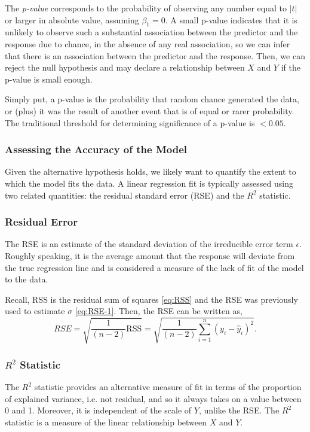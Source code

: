 \documentclass{article}
\numberwithin{equation}{section}
\begin{document}
The \textit{p-value} corresponds to the probability of observing any number equal to $|t|$ or larger in absolute value, assuming $\beta_1= 0$. A small p-value indicates that it is unlikely to observe such a substantial association between the predictor and the response due to chance, in the absence of any real association, so we can infer that there is an association between the predictor and the response. Then, we can reject the null hypothesis and may declare a relationship between $X$ and $Y$ if the p-value is small enough.

Simply put, a p-value is the probability that random chance generated the data, or (plus) it was the result of another event that is of equal or rarer probability. The traditional threshold for determining significance of a p-value is $< 0.05$.

\subsubsection{Assessing the Accuracy of the Model}
Given the alternative hypothesis holds, we likely want to quantify the extent to which the model fits the data. A linear regression fit is typically assessed using two related quantities: the residual standard error (RSE) and the $R^2$ statistic.

\subsubsection*{Residual Error}
The RSE is an estimate of the standard deviation of the irreducible error term $\epsilon$. Roughly speaking, it is the average amount that the response
will deviate from the true regression line and is considered a measure of the lack of fit of the model to the data. 

Recall, RSS is the residual sum of squares \eqref{eq:RSS} and the RSE was previously used to estimate $\sigma$ \eqref{eq:RSE-1}. Then, the RSE can be written as,
\begin{equation}
    RSE = \sqrt{\frac{1}{(n-2)} \text{RSS} } 
    = \sqrt{\frac{1}{(n-2)} \sum_{i=1}^n (y_i - \hat y_i)^2 }.
\end{equation}

\subsubsection*{\texorpdfstring{$R^2$}{R-Squared} Statistic} 
The $R^2$ statistic provides an alternative measure of fit in terms of the proportion of explained variance, i.e. not residual, and so it always takes on a value between 0 and 1. Moreover, it is independent of the scale of $Y$, unlike the RSE. The $R^2$ statistic is a measure of the linear relationship between $X$ and $Y$.
\end{document}

